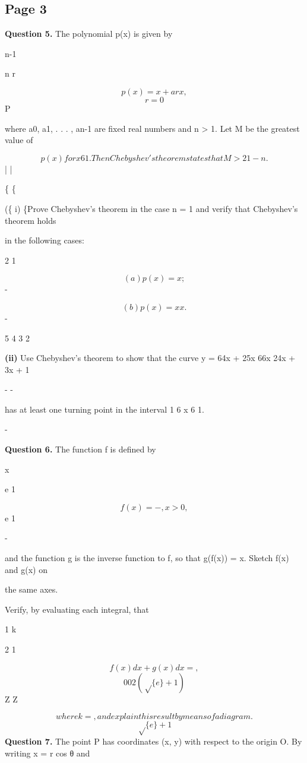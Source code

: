 \documentclass[12pt]{article}
\begin{document}
\subsection*{Page 3}
\begin{flushleft}
\bigskip\textbf{Question 5.} The polynomial p(x) is given by\par
n-1\par
n r\par
\[p(x) = x + arx ,\]
\[r=0\]
P\par
where a0, a1, . . . , an-1 are fixed real numbers and n > 1. Let M be the greatest value of\par
\[p(x) for x 6 1. Then Chebyshev's theorem states that M > 2 1-n .\]
| |\par
\{ \{\par
(\{ i) \{Prove Chebyshev's theorem in the case n = 1 and verify that Chebyshev's theorem holds\par
in the following cases:\par
2 1\par
\[(a) p(x) = x ;\]
-\par
\[(b) p(x) = x x .\]
-\par
5 4 3 2\par
\textbf{(ii)} Use Chebyshev's theorem to show that the curve y = 64x + 25x 66x 24x + 3x + 1\par
- -\par
has at least one turning point in the interval 1 6 x 6 1.\par
-\par
\bigskip\textbf{Question 6.} The function f is defined by\par
x\par
e 1\par
\[f(x) = - , x > 0,\]
e 1\par
-\par
and the function g is the inverse function to f, so that g(f(x)) = x. Sketch f(x) and g(x) on\par
the same axes.\par
Verify, by evaluating each integral, that\par
1 k\par
2 1\par
\[f(x) dx + g(x) dx = ,\]
\[0 0 2(\sqrt\{e\} + 1)\]
Z Z\par
\[where k = , and explain this result by means of a diagram.\]
\[\sqrt\{e\} + 1\]
\bigskip\textbf{Question 7.} The point P has coordinates (x, y) with respect to the origin O. By writing x = r cos θ and\par

\end{flushleft}
\end{document}
